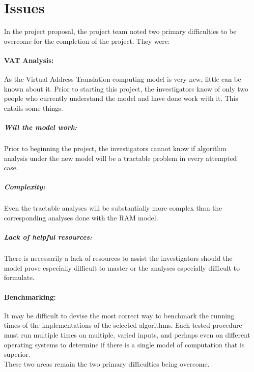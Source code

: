 \section{Issues}
  In the project proposal, the project team noted two primary
  difficulties to be overcome for the completion of the project. They were:
  \paragraph{VAT Analysis:} As the Virtual Address Translation computing model
  is very new, little can be known about it. Prior to starting this project,
  the investigators know of only two people who currently understand the model
  and have done work with it. This entails some things.
    \subparagraph{Will the model work:} Prior to beginning the project, the
    investigators cannot know if algorithm analysis under the new model will be
    a tractable problem in every attempted case.
    \subparagraph{Complexity:} Even the tractable analyses will be
    substantially more complex than the corresponding analyses done with the
    RAM model.
    \subparagraph{Lack of helpful resources:} There is necessarily a lack of
    resources to assist the investigators should the model prove especially
    difficult to master or the analyses especially difficult to formulate.
  \paragraph{Benchmarking:} It may be difficult to devise the most correct way
  to benchmark the running times of the implementations of the selected
  algorithms. Each tested procedure must run multiple times on multiple, varied
  inputs, and perhaps even on different operating systems to determine if
  there is a single model of computation that is superior.\\
  
  These two areas remain the two primary difficulties being overcome.
